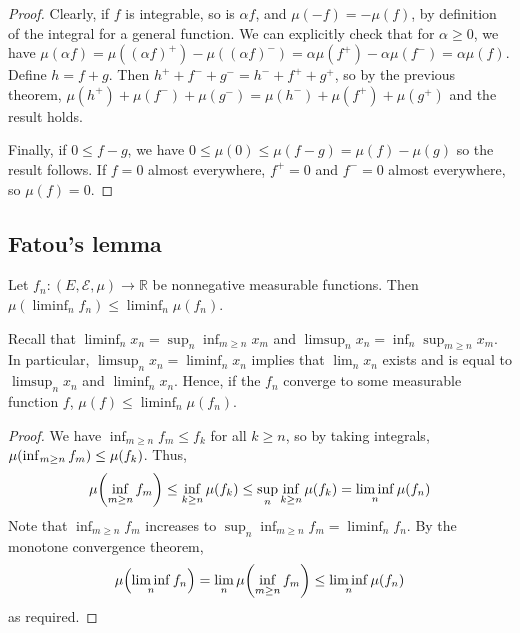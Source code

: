 \begin{proof}
	Clearly, if \( f \) is integrable, so is \( \alpha f \), and \( \mu(-f) = -\mu(f) \), by definition of the integral for a general function.
	We can explicitly check that for \( \alpha \geq 0 \), we have \( \mu(\alpha f) = \mu((\alpha f)^+) - \mu((\alpha f)^-) = \alpha \mu(f^+) - \alpha \mu(f^-) = \alpha \mu(f) \).
	Define \( h = f + g \).
	Then \( h^+ + f^- + g^- = h^- + f^+ + g^+ \), so by the previous theorem, \( \mu(h^+) + \mu(f^-) + \mu(g^-) = \mu(h^-) + \mu(f^+) + \mu(g^+) \) and the result holds.

	Finally, if \( 0 \leq f - g \), we have \( 0 \leq \mu(0) \leq \mu(f - g) = \mu(f) - \mu(g) \) so the result follows.
	If \( f = 0 \) almost everywhere, \( f^+ = 0 \) and \( f^- = 0 \) almost everywhere, so \( \mu(f) = 0 \).
\end{proof}

\subsection{Fatou's lemma}
\begin{lemma}
	Let \( f_n \colon (E, \mathcal E, \mu) \to \mathbb R \) be nonnegative measurable functions.
	Then \( \mu (\liminf_n f_n) \leq \liminf_n \mu(f_n) \).
\end{lemma}
\begin{remark}
	Recall that \( \liminf_n x_n = \sup_n \inf_{m \geq n} x_m \) and \( \limsup_n x_n = \inf_n \sup_{m \geq n} x_m \).
	In particular, \( \limsup_n x_n = \liminf_n x_n \) implies that \( \lim_n x_n \) exists and is equal to \( \limsup_n x_n \) and \( \liminf_n x_n \).
	Hence, if the \( f_n \) converge to some measurable function \( f \), \( \mu(f) \leq \liminf_n \mu(f_n) \).
\end{remark}
\begin{proof}
	We have \( \inf_{m \geq n} f_m \leq f_k \) for all \( k \geq n \), so by taking integrals, \( \mu\qty(\inf_{m \geq n} f_m) \leq \mu(f_k) \).
	Thus,
	\[ \mu\qty(\inf_{m \geq n} f_m) \leq \inf_{k \geq n} \mu(f_k) \leq \sup_n \inf_{k \geq n} \mu(f_k) = \liminf_n \mu(f_n) \]
	Note that \( \inf_{m \geq n} f_m \) increases to \( \sup_n \inf_{m \geq n} f_m = \liminf_n f_n \).
	By the monotone convergence theorem,
	\[ \mu\qty(\liminf_n f_n) = \lim_n \mu\qty(\inf_{m \geq n} f_m) \leq \liminf_n \mu(f_n) \]
	as required.
\end{proof}

